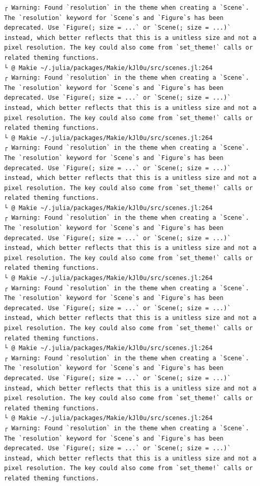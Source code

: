 \documentclass[
  english,
  russian,
  12pt,
  a4paper,
  DIV=11,
  numbers=noendperiod]{scrreprt}
\begin{document}
\begin{verbatim}
┌ Warning: Found `resolution` in the theme when creating a `Scene`. The `resolution` keyword for `Scene`s and `Figure`s has been deprecated. Use `Figure(; size = ...` or `Scene(; size = ...)` instead, which better reflects that this is a unitless size and not a pixel resolution. The key could also come from `set_theme!` calls or related theming functions.
└ @ Makie ~/.julia/packages/Makie/kJl0u/src/scenes.jl:264
┌ Warning: Found `resolution` in the theme when creating a `Scene`. The `resolution` keyword for `Scene`s and `Figure`s has been deprecated. Use `Figure(; size = ...` or `Scene(; size = ...)` instead, which better reflects that this is a unitless size and not a pixel resolution. The key could also come from `set_theme!` calls or related theming functions.
└ @ Makie ~/.julia/packages/Makie/kJl0u/src/scenes.jl:264
┌ Warning: Found `resolution` in the theme when creating a `Scene`. The `resolution` keyword for `Scene`s and `Figure`s has been deprecated. Use `Figure(; size = ...` or `Scene(; size = ...)` instead, which better reflects that this is a unitless size and not a pixel resolution. The key could also come from `set_theme!` calls or related theming functions.
└ @ Makie ~/.julia/packages/Makie/kJl0u/src/scenes.jl:264
┌ Warning: Found `resolution` in the theme when creating a `Scene`. The `resolution` keyword for `Scene`s and `Figure`s has been deprecated. Use `Figure(; size = ...` or `Scene(; size = ...)` instead, which better reflects that this is a unitless size and not a pixel resolution. The key could also come from `set_theme!` calls or related theming functions.
└ @ Makie ~/.julia/packages/Makie/kJl0u/src/scenes.jl:264
┌ Warning: Found `resolution` in the theme when creating a `Scene`. The `resolution` keyword for `Scene`s and `Figure`s has been deprecated. Use `Figure(; size = ...` or `Scene(; size = ...)` instead, which better reflects that this is a unitless size and not a pixel resolution. The key could also come from `set_theme!` calls or related theming functions.
└ @ Makie ~/.julia/packages/Makie/kJl0u/src/scenes.jl:264
┌ Warning: Found `resolution` in the theme when creating a `Scene`. The `resolution` keyword for `Scene`s and `Figure`s has been deprecated. Use `Figure(; size = ...` or `Scene(; size = ...)` instead, which better reflects that this is a unitless size and not a pixel resolution. The key could also come from `set_theme!` calls or related theming functions.
└ @ Makie ~/.julia/packages/Makie/kJl0u/src/scenes.jl:264
┌ Warning: Found `resolution` in the theme when creating a `Scene`. The `resolution` keyword for `Scene`s and `Figure`s has been deprecated. Use `Figure(; size = ...` or `Scene(; size = ...)` instead, which better reflects that this is a unitless size and not a pixel resolution. The key could also come from `set_theme!` calls or related theming functions.

\end{verbatim}
\end{document}
